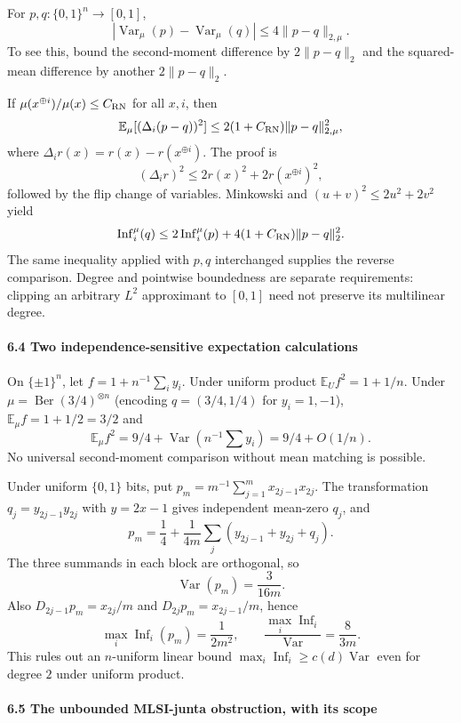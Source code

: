 For \(p,q:\{0,1\}^n\to[0,1]\),
\[|\operatorname{Var}_\mu(p)-\operatorname{Var}_\mu(q)|
\le4\|p-q\|_{2,\mu}.\]
To see this, bound the second-moment difference by \(2\|p-q\|_2\) and the squared-mean difference by another \(2\|p-q\|_2\).

If \(\mu(x^{\oplus i})/\mu(x)\le C_{\rm RN}\) for all \(x,i\), then
\[\mathbb E_\mu[(\Delta_i(p-q))^2]
\le2(1+C_{\rm RN})\|p-q\|_{2,\mu}^2,\]
where \(\Delta_ir(x)=r(x)-r(x^{\oplus i})\). The proof is
\[(\Delta_ir)^2\le2r(x)^2+2r(x^{\oplus i})^2,\]
followed by the flip change of variables. Minkowski and \((u+v)^2\le2u^2+2v^2\) yield
\[\operatorname{Inf}_i^\mu(q)
\le2\operatorname{Inf}_i^\mu(p)+4(1+C_{\rm RN})\|p-q\|_2^2.\]
The same inequality applied with \(p,q\) interchanged supplies the reverse comparison. Degree and pointwise boundedness are separate requirements: clipping an arbitrary \(L^2\) approximant to \([0,1]\) need not preserve its multilinear degree.

\paragraph{6.4 Two independence-sensitive expectation calculations}\label{two-independence-sensitive-expectation-calculations}

On \(\{\pm1\}^n\), let \(f=1+n^{-1}\sum_i y_i\). Under uniform product \(\mathbb E_Uf^2=1+1/n\). Under \(\mu=\operatorname{Ber}(3/4)^{\otimes n}\) (encoding \(q=(3/4,1/4)\) for \(y_i=1,-1\)), \(\mathbb E_\mu f=1+1/2=3/2\) and
\[\mathbb E_\mu f^2=9/4+\operatorname{Var}(n^{-1}\sum y_i)=9/4+O(1/n).\]
No universal second-moment comparison without mean matching is possible.

Under uniform \(\{0,1\}\) bits, put \(p_m=m^{-1}\sum_{j=1}^mx_{2j-1}x_{2j}\). The transformation \(q_j=y_{2j-1}y_{2j}\) with \(y=2x-1\) gives independent mean-zero \(q_j\), and
\[p_m=\frac14+\frac1{4m}\sum_j(y_{2j-1}+y_{2j}+q_j).\]
The three summands in each block are orthogonal, so
\[\operatorname{Var}(p_m)=\frac{3}{16m}.\]
Also \(D_{2j-1}p_m=x_{2j}/m\) and \(D_{2j}p_m=x_{2j-1}/m\), hence
\[\max_i\operatorname{Inf}_i(p_m)=\frac1{2m^2},
\qquad \frac{\max_i\operatorname{Inf}_i}{\operatorname{Var}}=\frac{8}{3m}.\]
This rules out an \(n\)-uniform linear bound \(\max_i\operatorname{Inf}_i\ge c(d)\operatorname{Var}\) even for degree \(2\) under uniform product.

\paragraph{6.5 The unbounded MLSI-junta obstruction, with its scope}\label{the-unbounded-mlsi-junta-obstruction-with-its-scope}

